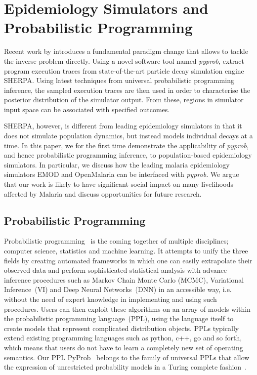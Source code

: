 \documentclass{article}
\begin{document}
\section{Epidemiology Simulators and Probabilistic Programming}
\label{sec:background}

Recent work by \citep{Baydin} introduces a fundamental paradigm change that allows to tackle the inverse problem directly. 
Using a novel software tool named \textit{pyprob}, \citep{Baydin} extract program execution traces from state-of-the-art particle decay simulation engine SHERPA\cite{}.
 Using latest techniques from universal probabilistic programming inference, the sampled execution traces are then used in order to characterise the posterior distribution of the simulator output. 
 From these, regions in simulator input space can be associated with specified outcomes.

SHERPA, however, is different from leading epidemiology simulators in that it does not simulate population dynamics, but instead models individual decays at a time.
 In this paper, we for the first time demonstrate the applicability of \textit{pyprob}, and hence probabilistic programming inference, to population-based epidemiology simulators. 
 In particular, we discuss how the leading malaria epidemiology simulators EMOD\cite{} and OpenMalaria\cite{} can be interfaced with \textit{pyprob}.
  We argue that our work is likely to have significant social impact on many livelihoods affected by Malaria and discuss opportunities for future research.

\subsection{Probabilistic Programming}
Probabilistic programming~\cite{gordon2014probabilistic,staton2016semantics,kozen1979semantics} is the coming together of multiple disciplines; computer science, statistics and machine learning. 
It attempts to unify the three fields by creating automated frameworks in which one can easily extrapolate their observed data and perform sophisticated statistical analysis with advance inference procedures such as 
Markov Chain Monte Carlo (MCMC), Variational Inference~(VI) and Deep Neural Networks~(DNN) in an accessible way, i.e. without the need of expert knowledge in implementing and using such procedures.
Users can then exploit these algorithms on an array of models
within the probabilistic programming language~(PPL), using the language itself to create models that represent complicated distribution objects. 
PPLs typically extend existing programming languages such as python, c++, go and so forth, which means that users do not have to learn
a completely new set of operating semantics.  
Our PPL PyProb~\cite{le-2016-inference,baydin2018efficient} belongs to the family of universal PPLs 
that allow the expression of unrestricted probability models in a Turing complete fashion~\cite{wood2014new,goodman2012church,landau_binder_2014,siddharth2017learning,bingham2019pyro}.
\end{document}
